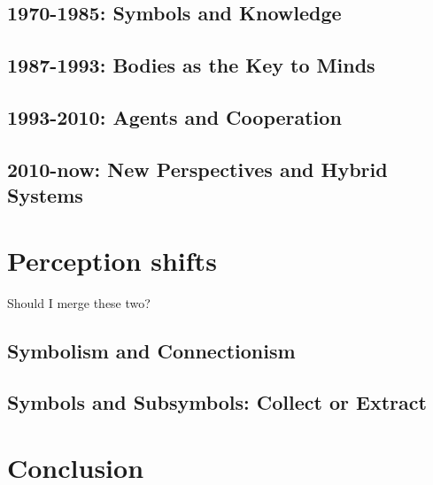 \documentclass{article}
\begin{document}
\subsection{1970-1985: Symbols and Knowledge}


\subsection{1987-1993: Bodies as the Key to Minds}


\subsection{1993-2010: Agents and Cooperation}


\subsection{2010-now: New Perspectives and Hybrid Systems}


\section{Perception shifts}
Should I merge these two?
\subsection{Symbolism and Connectionism}
\subsection{Symbols and Subsymbols: Collect or Extract}

\section{Conclusion}


\printbibliography
\end{document}
